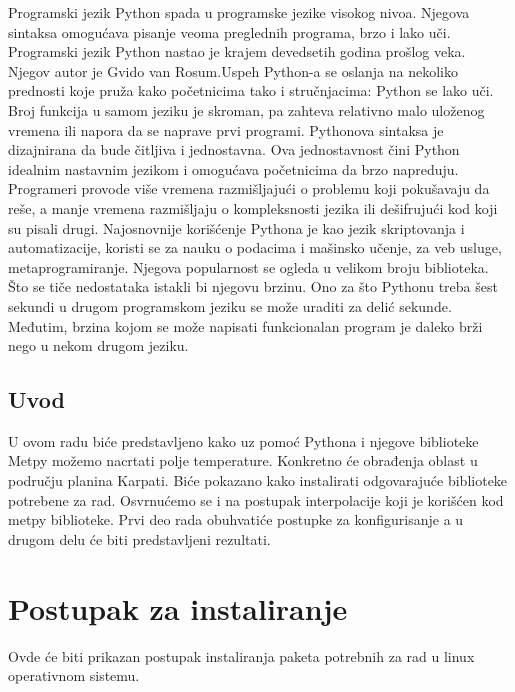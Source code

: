 \documentclass[12pt]{article}
\begin{document}
\begin{center}
Programski jezik Python spada u programske jezike visokog nivoa. Njegova sintaksa omogućava pisanje veoma preglednih programa, brzo i lako uči. Programski jezik Python nastao je krajem devedsetih godina prošlog veka. Njegov autor je Gvido van Rosum.Uspeh Python-a se oslanja na nekoliko prednosti koje pruža kako početnicima tako i stručnjacima: Python se lako uči. Broj funkcija u samom jeziku je skroman, pa zahteva relativno malo uloženog vremena ili napora da se naprave prvi programi. Pythonova sintaksa je dizajnirana da bude čitljiva i jednostavna. Ova jednostavnost čini Python idealnim nastavnim jezikom i omogućava početnicima da brzo napreduju. Programeri provode više vremena razmišljajući o problemu koji pokušavaju da reše, a manje vremena razmišljaju o kompleksnosti jezika ili dešifrujući kod koji su pisali drugi. 
Najosnovnije korišćenje Pythona je kao jezik skriptovanja i automatizacije, koristi se za nauku o podacima i mašinsko učenje, za veb usluge, metaprogramiranje. Njegova popularnost se ogleda u velikom broju biblioteka. Što se tiče nedostataka istakli bi njegovu brzinu. Ono za što Pythonu treba šest sekundi u drugom programskom jeziku se može uraditi za delić sekunde. Međutim, brzina kojom se može napisati funkcionalan program je daleko brži nego u nekom drugom jeziku.  
\end{center}
\newpage
\begin{center}
\section*{Uvod}
U ovom radu biće predstavljeno kako uz pomoć Pythona i njegove biblioteke Metpy možemo nacrtati polje temperature. Konkretno će obrađenja oblast u području planina Karpati. Biće pokazano kako instalirati odgovarajuće biblioteke potrebene za rad. Osvrnućemo se i na postupak interpolacije koji je korišćen kod metpy biblioteke. Prvi deo rada obuhvatiće postupke za konfigurisanje a u drugom delu će biti predstavljeni rezultati. 
\end{center}
\newpage
\section{Postupak za instaliranje}
Ovde će biti prikazan postupak instaliranja paketa potrebnih za rad u linux operativnom sistemu. 
\end{document}
